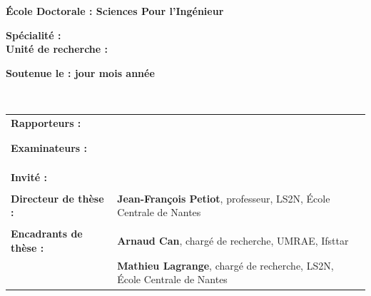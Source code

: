 \documentclass[10pt]{book}
\begin{document}
\begin{titlepage}
\begin{minipage}{\linewidth}
{\large\bf \'Ecole Doctorale : Sciences Pour l'Ingénieur}

\vspace{0.2cm}

{\large\bf Spécialité : }\\
{\large\bf Unité de recherche : }

\vspace{0.2cm}

{\large\bf Soutenue le : jour mois année}

\end{minipage}

\vspace{1.5cm}

\begin{minipage}{\linewidth}
\\
\end{minipage}

\vspace{1cm}


\begin{minipage}{\linewidth}
\begin{tabular}{p{4cm}p{15cm}}
\bf Rapporteurs : & \\
 & \\
 & \\
\bf  Examinateurs : & \\
 & \\
 & \\
 & \\
\bf  Invité : & \\
 & \\
\textbf{Directeur de thèse : } & \textbf{Jean-François Petiot}, professeur, LS2N, \'Ecole Centrale de Nantes \\
 & \\
\textbf{Encadrants de thèse : } & \textbf{Arnaud Can}, chargé de recherche, UMRAE, Ifsttar \\
 & \textbf{Mathieu Lagrange}, chargé de recherche, LS2N, \'Ecole Centrale de Nantes
\end{tabular}
\end{minipage}

\end{titlepage}
\end{document}
